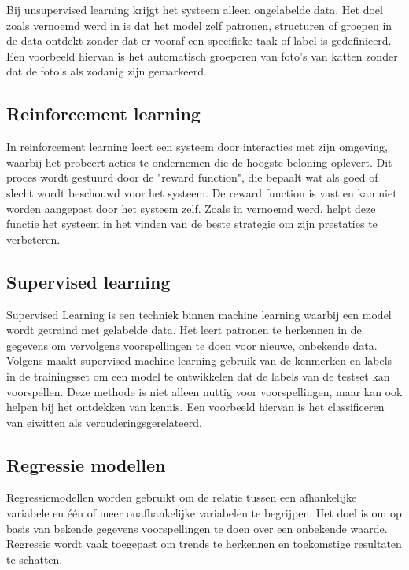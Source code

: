 Bij unsupervised learning krijgt het systeem alleen ongelabelde data. Het doel zoals vernoemd werd in \textcite{Naeem2023} is dat het model zelf patronen, structuren of groepen in de data ontdekt zonder dat er vooraf een specifieke taak of label is gedefinieerd. Een voorbeeld hiervan is het automatisch groeperen van foto’s van katten zonder dat de foto’s als zodanig zijn gemarkeerd.

\subsection*{Reinforcement learning}

In reinforcement learning leert een systeem door interacties met zijn omgeving, waarbij het probeert acties te ondernemen die de hoogste beloning oplevert. Dit proces wordt gestuurd door de "reward function", die bepaalt wat als goed of slecht wordt beschouwd voor het systeem. De reward function is vast en kan niet worden aangepast door het systeem zelf. Zoals in \textcite{Gallistel1999} vernoemd werd, helpt deze functie het systeem in het vinden van de beste strategie om zijn prestaties te verbeteren.

\subsection*{Supervised learning}

Supervised Learning is een techniek binnen machine learning waarbij een model wordt getraind met gelabelde data. Het leert patronen te herkennen in de gegevens om vervolgens voorspellingen te doen voor nieuwe, onbekende data. Volgens \textcite{Fabris2017} maakt supervised machine learning gebruik van de kenmerken en labels in de trainingsset om een model te ontwikkelen dat de labels van de testset kan voorspellen. Deze methode is niet alleen nuttig voor voorspellingen, maar kan ook helpen bij het ontdekken van kennis. Een voorbeeld hiervan is het classificeren van eiwitten als verouderingsgerelateerd.

\subsection{Regressie modellen}

Regressiemodellen worden gebruikt om de relatie tussen een afhankelijke variabele en één of meer onafhankelijke variabelen te begrijpen. Het doel is om op basis van bekende gegevens voorspellingen te doen over een onbekende waarde. Regressie wordt vaak toegepast om trends te herkennen en toekomstige resultaten te schatten.

